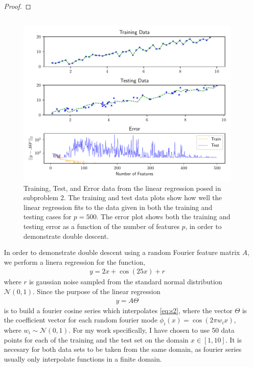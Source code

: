 \documentclass{article}
\begin{document}
\begin{proof}
\end{proof}

\subsection{}

\begin{figure}[ht]
    \centering
    \includegraphics[width=\textwidth]{hw1s2.pdf}
    \caption{Training, Test, and Error data from the linear regression posed in
    subproblem 2. The training and test data plots show how well the linear
    regression fits to the data given in both the training and testing cases for
    $p=500$. The error plot shows both the training and testing error as a
    function of the number of features $p$, in order to demonstrate double
    descent.}
    \label{fig:s2}
\end{figure}

In order to demonstrate double descent using a random Fourier feature matrix
$A$, we perform a linera regression for the function, 
\begin{gather}
    y = 2x + \cos(25x) + r
    \label{eq:s2}
\end{gather}
where $r$ is gaussian noise sampled from the standard normal distribution $\mathcal{N}(0,1)$.
Since the purpose of the linear regression 
\begin{gather*}
    y = A\Theta
\end{gather*}
is to build a fourier cosine series which interpolates \eqref{eq:s2}, where the
vector $\Theta$ is the coefficient vector for each random fourier mode
$\phi_i(x) = \cos(2\pi w_ix)$, where $w_i \sim \mathcal{N}(0,1)$. For my work
specifically, I have chosen to use 50 data points for each of the training and
the test set on the domain $x \in [1,10]$. It is necesary for both data sets to
be taken from the same domain, as fourier series usually only interpolate
functions in a finite domain. 
\end{document}
